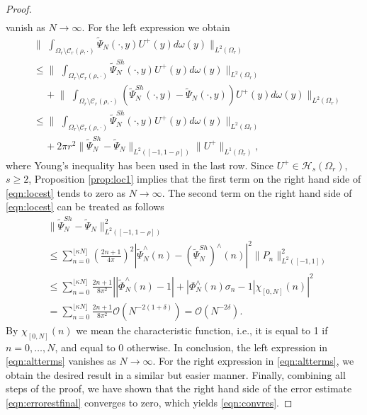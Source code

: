 \documentclass[a4paper, 10pt]{article}
\numberwithin{equation}{section}
\theoremstyle{definition}
\begin{document}
\begin{proof}
\begin{align}
\end{align}\normalsize
vanish as $N\to\infty$. For the left expression we obtain
\begin{equation}\label{eqn:locest}
\begin{aligned}
&\Bigg\|\,\,\int_{\Omega_r\setminus\mathcal{C}_r(\rho,\cdot)}\tilde{\Psi}_{N}(\cdot,y) U^+(y)d\omega(y)\Bigg\|_{L^2(\Omega_r)}
\\&\leq\Bigg\|\,\,\int_{\Omega_r\setminus\mathcal{C}_r(\rho,\cdot)}\tilde{\Psi}^{Sh}_{N}(\cdot,y) U^+(y)d\omega(y)\Bigg\|_{L^2(\Omega_r)}
\\&\quad\,+\Bigg\|\,\,\int_{\Omega_r\setminus\mathcal{C}_r(\rho,\cdot)}\left(\tilde{\Psi}^{Sh}_{N}(\cdot,y)-\tilde{\Psi}_{N}(\cdot,y)\right) U^+(y)d\omega(y)\Bigg\|_{L^2(\Omega_r)}
\\&\leq\Bigg\|\,\,\int_{\Omega_r\setminus\mathcal{C}_r(\rho,\cdot)}\tilde{\Psi}^{Sh}_{N}(\cdot,y) U^+(y)d\omega(y)\Bigg\|_{L^2(\Omega_r)}
\\&\quad\,+2\pi r^2\|\tilde{\Psi}^{Sh}_{N}-\tilde{\Psi}_{N}\|_{L^2([-1,1-\rho])} \|U^+\|_{L^1(\Omega_r)},
\end{aligned}
\end{equation}
where Young's inequality has been used in the last row. Since $U^+\in \mathcal{H}_s(\Omega_r)$, $s\geq 2$, Proposition \ref{prop:loc1} implies that the first term on the right hand side of \eqref{eqn:locest} tends to zero as $N\to\infty$. The second term on the right hand side of \eqref{eqn:locest} can be treated as follows 
\begin{equation}
\begin{aligned}
&\big\|\tilde{\Psi}^{Sh}_{N}-\tilde{\Psi}_{N}\big\|_{L^2([-1,1-\rho])}^2
\\&\leq\sum_{n=0}^{\lfloor\kappa N\rfloor}\left(\frac{2n+1}{4\pi}\right)^2\left|\tilde{\Psi}_N^\wedge(n)-\left(\tilde{\Psi}^{Sh}_N\right)^\wedge(n)\right|^2\|P_n\|_{L^2([-1,1])}^2
\\&\leq\sum_{n=0}^{\lfloor\kappa N\rfloor}\frac{2n+1}{8\pi^2}\left|\left|\tilde{\Phi}_{N}^\wedge(n)-1\right|+\left|{\Phi}_N^\wedge(n)\sigma_n-1\right|\chi_{[0,N]}(n)\right|^2
\\&=\sum_{n=0}^{\lfloor\kappa N\rfloor}\frac{2n+1}{8\pi^2}\mathcal{O}\left(N^{-2(1+\delta)}\right)=\mathcal{O}\left(N^{-2\delta}\right).
\end{aligned}
\end{equation}
By $\chi_{[0,N]}(n)$ we mean the characteristic function, i.e., it is equal to 1 if $n=0,\ldots,N$, and equal to 0 otherwise. In conclusion, the left expression in \eqref{eqn:altterms} vanishes as $N\to\infty$. For the right expression in \eqref{eqn:altterms}, we obtain the desired result in a similar but easier manner. Finally, combining all steps of the proof, we have shown that the right hand side of the error estimate \eqref{eqn:errorestfinal} converges to zero, which yields \eqref{eqn:convres}. 
\end{proof}
\end{document}

